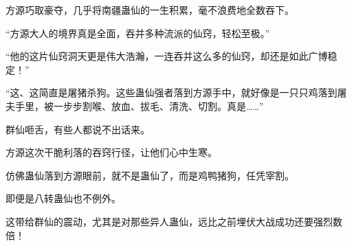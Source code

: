 \begin{this_body}
方源巧取豪夺，几乎将南疆蛊仙的一生积累，毫不浪费地全数吞下。

“方源大人的境界真是全面，吞并多种流派的仙窍，轻松至极。”

“他的这片仙窍洞天更是伟大浩瀚，一连吞并这么多的仙窍，却还是如此广博稳定！”

“这、这简直是屠猪杀狗。这些蛊仙强者落到方源手中，就好像是一只只鸡落到屠夫手里，被一步步割喉、放血、拔毛、清洗、切割。真是……”

群仙咂舌，有些人都说不出话来。

方源这次干脆利落的吞窍行径，让他们心中生寒。

仿佛蛊仙落到方源眼前，就不是蛊仙了，而是鸡鸭猪狗，任凭宰割。

即便是八转蛊仙也不例外。

这带给群仙的震动，尤其是对那些异人蛊仙，远比之前埋伏大战成功还要强烈数倍！

\end{this_body}

